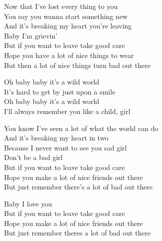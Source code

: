 
\ve{}
Now that I've lost every thing to you\\
You say you wanna start something new\\
And it's breaking my heart you're leaving\\
Baby I'm grievin'\\
But if you want to leave take good care\\
Hope you have a lot of nice things to wear\\
But then a lot of nice things turn bad out there

\cho{}
Oh baby baby it's a wild world\\
It's hard to get by just upon a smile\\
Oh baby baby it's a wild world\\
I'll always remember you like a child, girl

\ve{}
You know I've seen a lot of what the world can do\\
And it's breaking my heart in two\\
Because I never want to see you sad girl\\
Don't be a bad girl\\
But if you want to leave take good care\\
Hope you make a lot of nice friends out there\\
But just remember there's a lot of bad out there

        
\cho{}


\re{}
Baby I love you\\
But if you want to leave take good care\\
Hope you make a lot of nice friends out there\\
But just remember theres a lot of bad out there

\cho{}

\esong{}